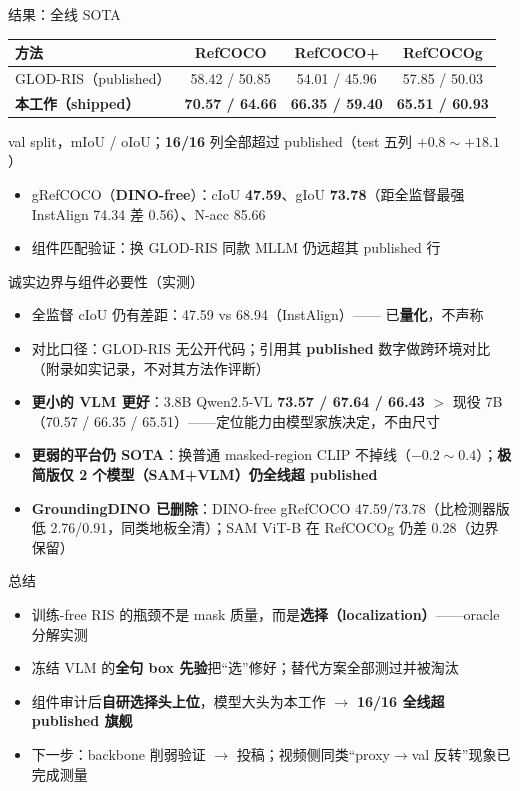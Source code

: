 \documentclass[aspectratio=169,12pt]{beamer}
\begin{document}
\begin{frame}{结果：全线 SOTA}
\centering
\begin{table}
\small
\begin{tabular}{lccc}
\toprule
方法 & RefCOCO & RefCOCO+ & RefCOCOg \\
\midrule
GLOD-RIS（published） & 58.42 / 50.85 & 54.01 / 45.96 & 57.85 / 50.03 \\
\textbf{本工作（shipped）} & \textbf{70.57 / 64.66} & \textbf{66.35 / 59.40} & \textbf{65.51 / 60.93} \\
\bottomrule
\end{tabular}
\end{table}
\vspace{-0.2em}
{\footnotesize val split，mIoU / oIoU；\textbf{16/16} 列全部超过 published（test 五列 $+0.8\sim+18.1$）}\\[0.5em]
\begin{itemize}
  \item gRefCOCO（\textbf{DINO-free}）：cIoU \textbf{47.59}、gIoU \textbf{73.78}（距全监督最强 InstAlign 74.34 差 0.56）、N-acc 85.66
  \item 组件匹配验证：换 GLOD-RIS 同款 MLLM 仍远超其 published 行
\end{itemize}
\end{frame}

\begin{frame}{诚实边界与组件必要性（实测）}
\begin{itemize}
  \item 全监督 cIoU 仍有差距：47.59 vs 68.94（InstAlign）—— 已\textbf{量化}，不声称
  \item 对比口径：GLOD-RIS 无公开代码；引用其 \textbf{published} 数字做跨环境对比（附录如实记录，不对其方法作评断）
  \item \textbf{更小的 VLM 更好}：3.8B Qwen2.5-VL \textbf{73.57 / 67.64 / 66.43} $>$ 现役 7B（70.57 / 66.35 / 65.51）——定位能力由模型家族决定，不由尺寸
  \item \textbf{更弱的平台仍 SOTA}：换普通 masked-region CLIP 不掉线（$-0.2\sim0.4$）；\textbf{极简版仅 2 个模型（SAM+VLM）仍全线超 published}
  \item \textbf{GroundingDINO 已删除}：DINO-free gRefCOCO 47.59/73.78（比检测器版低 2.76/0.91，同类地板全清）；SAM ViT-B 在 RefCOCOg 仍差 0.28（边界保留）
\end{itemize}
\end{frame}

\begin{frame}{总结}
\begin{itemize}
  \item 训练-free RIS 的瓶颈不是 mask 质量，而是\textbf{选择（localization）}——oracle 分解实测
  \item 冻结 VLM 的\textbf{全句 box 先验}把``选''修好；替代方案全部测过并被淘汰
  \item 组件审计后\textbf{自研选择头上位}，模型大头为本工作 $\rightarrow$ \textbf{16/16 全线超 published 旗舰}
  \item 下一步：backbone 削弱验证 $\rightarrow$ 投稿；视频侧同类``proxy$\rightarrow$val 反转''现象已完成测量
\end{itemize}
\end{frame}
\end{document}
